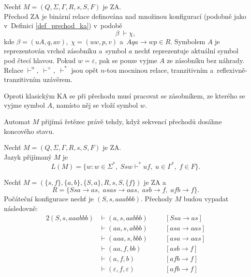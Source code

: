 \begin{definition}\label{def_prechod_za}
    Nechť $M = (Q, \Sigma, \Gamma, R, s, S, F)$ je ZA.\\
    Přechod ZA je binární relace definována nad množinou konfigurací (podobně jako v~Definici \ref{def_prechod_ka}) v~podobě
    \begin{equation*}
        \beta\; \vdash \chi,
    \end{equation*}
    kde $\beta = (uA, q, av),\; \chi = (uw, p, v)$ a~$Aqa \rightarrow wp \in R$.
    Symbolem $A$ je reprezentován vrchol zásobníku a~symbol $a$ nechť reprezentuje aktuální symbol pod čtecí hlavou.
    Pokud $w = \varepsilon$, pak se pouze vyjme $A$ ze zásobníku bez náhrady.
    Relace $\vdash^n,\; \vdash^+,\; \vdash^*$ jsou opět $n$-tou mocninou relace, tranzitivním a~reflexivně-tran\-zi\-tiv\-ním uzávěrem.
\end{definition}
Oproti klasickým KA se při přechodu musí pracovat se zásobníkem, ze kterého se vyjme symbol $A$, namísto něj se vloží symbol $w$.

Automat $M$ přijímá řetězec právě tehdy, když sekvencí přechodů dosáhne koncového stavu.
\begin{definition}\label{def_jazyk_za}
    Nechť $M = (Q, \Sigma, \Gamma, R, s, S, F)$ je ZA.\\
    Jazyk přijímaný $M$ je
    \begin{equation*}
        L(M) = \{w : w \in \Sigma^*,\; Ssw \vdash^* uf,\; u \in \Gamma^*,\; f \in F\}.
    \end{equation*}
\end{definition}

\begin{example}\label{example_za}
    Nechť $M = (\{s, f\}, \{a, b\}, \{S, a\}, R, s, S, \{f\})$ je ZA a 
    \begin{equation*}
        R = \{Ssa \rightarrow as,\; asas \rightarrow aas,\; asb \rightarrow f,\; afb \rightarrow f\}.
    \end{equation*}
    Počáteční konfigurace nechť je $(S, s, aaabbb)$.
    Přechody $M$ budou vypadat následovně:
    \begin{alignat*}{2}
        (S, s, aaabbb) &\vdash (a, s, aabbb) \quad && [Ssa \rightarrow as] \\
                       &\vdash (aa, s, abbb) \quad && [asa \rightarrow aas] \\
                       &\vdash (aaa, s, bbb) \quad && [asa \rightarrow aas] \\
                       &\vdash (aa, f, bb) \quad   && [asb \rightarrow f] \\ 
                       &\vdash (a, f, b) \quad      && [afb \rightarrow f] \\
                       &\vdash (\varepsilon, f, \varepsilon) \quad && [afb \rightarrow f]
    \end{alignat*}
\end{example}

